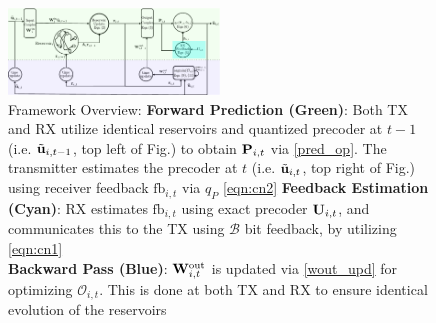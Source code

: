 \documentclass[conference]{IEEEtran}
\begin{document}
{\begin{figure}[ht]
\centering
\includegraphics[width=0.5\textwidth]{images/system2.pdf}
\caption{Framework Overview: \textbf{Forward Prediction (Green)}: Both TX and RX utilize identical reservoirs and quantized precoder at $t-1$ (i.e. $\tilde{{\bf u}}_{i,t-1}$, top left of Fig.) to obtain ${\bf P}_{i,t}$ via \eqref{pred_op}. The transmitter estimates the precoder at $t$ (i.e. $\tilde{{\bf u}}_{i,t}$, top right of Fig.) using receiver feedback $\text{fb}_{i,t}$ via $q_P$ \eqref{eqn:cn2}
\textbf{Feedback Estimation (Cyan)}: RX estimates $\text{fb}_{i,t}$ using exact precoder ${\bf U}_{i,t}$, and communicates this to the TX using $\mathcal{B}$ bit feedback, by utilizing \eqref{eqn:cn1}\\ 
\textbf{Backward Pass (Blue)}: ${\bf W}^{\text{out}}_{i,t}$ is updated via \eqref{wout_upd} for optimizing $\mathcal{O}_{i,t}$. This is done at both TX and RX to ensure identical evolution of the reservoirs}
\label{res_overview}
\end{figure}

}
\end{document}
